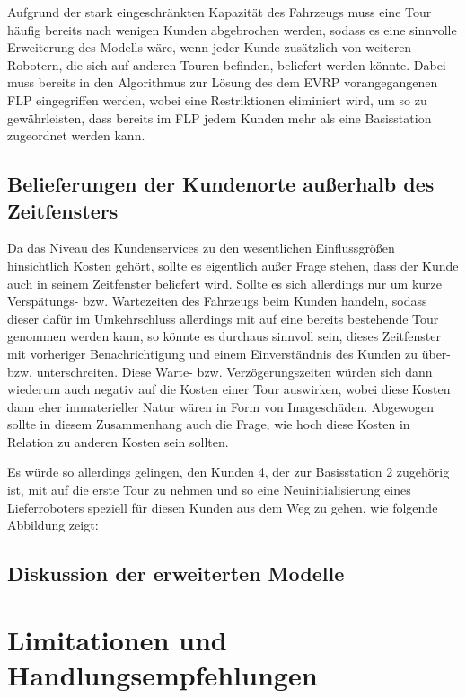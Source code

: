 \documentclass[a4paper,12pt,parskip,bibtotoc,liststotoc]{article}
\begin{document}
Aufgrund der stark eingeschränkten Kapazität des Fahrzeugs muss eine Tour häufig bereits nach wenigen Kunden abgebrochen werden, sodass es eine sinnvolle Erweiterung des Modells wäre, wenn jeder Kunde zusätzlich von weiteren Robotern, die sich auf anderen Touren befinden, beliefert werden könnte.
Dabei muss bereits in den Algorithmus zur Lösung des dem EVRP vorangegangenen  FLP eingegriffen werden, wobei eine Restriktionen eliminiert wird, um so zu gewährleisten, dass bereits im FLP jedem Kunden mehr als eine Basisstation zugeordnet werden kann.



\subsection{Belieferungen der Kundenorte außerhalb des Zeitfensters}

Da das Niveau des Kundenservices zu den wesentlichen Einflussgrößen hinsichtlich Kosten gehört, sollte es eigentlich außer Frage stehen, dass der Kunde auch in seinem Zeitfenster beliefert wird.
Sollte es sich allerdings nur um kurze Verspätungs- bzw. Wartezeiten des Fahrzeugs beim Kunden handeln, sodass dieser dafür im Umkehrschluss allerdings mit auf eine bereits bestehende Tour genommen werden kann, so könnte es durchaus sinnvoll sein, dieses Zeitfenster mit vorheriger Benachrichtigung und einem Einverständnis des Kunden zu über- bzw. unterschreiten.
Diese Warte- bzw. Verzögerungszeiten würden sich dann wiederum auch negativ auf die Kosten einer Tour auswirken, wobei diese Kosten dann eher immaterieller Natur wären in Form von Imageschäden. 
Abgewogen sollte in diesem Zusammenhang auch die Frage, wie hoch diese Kosten in Relation zu anderen Kosten sein sollten.

Es würde so allerdings gelingen, den Kunden 4, der zur Basisstation 2 zugehörig ist, mit auf die erste Tour zu nehmen und so eine Neuinitialisierung eines Lieferroboters speziell für diesen Kunden aus dem Weg zu gehen, wie folgende Abbildung zeigt: 




\subsection{Diskussion der erweiterten Modelle}




\newpage
\section{Limitationen und Handlungsempfehlungen}
\end{document}
